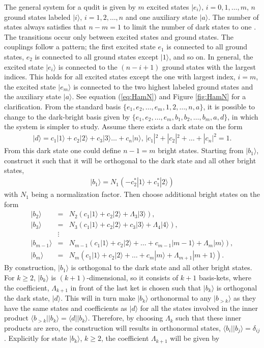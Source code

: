 \documentclass[pra,showpacs,priprent,twocolumn,superscriptaddress]{revtex4-1}
\newcommand{\ket}[1]{|#1\rangle}
\newcommand{\bra}[1]{\langle #1|}
\begin{document}
The general system for a qudit is given by $m$ excited states $\ket{e_i},\,i = 0,1,\dots,m$, $n$ ground states labeled $\ket{i},\,i = 1,2,\dots,n$ and one auxiliary state $\ket{a}$. The number of states always satisfies that $n-m = 1$ to limit the number of dark states to one \cite{shkolnikov20}.
The transitions occur only between excited states and ground states. The couplings follow a pattern; the first excited state $e_1$ is connected to all ground states, $e_2$ is connected to all ground states except $\ket{1}$, and so on. In general, the excited state $\ket{e_i}$ is connected to the $(n - i + 1)$ ground states with the largest indices. This holds for all excited states except the one with largest index, $i = m$, the excited state $\ket{e_m}$ is connected to the two highest labeled ground states and the auxiliary state $\ket{a}$. See equation (\ref{eq:HamN}) and Figure \ref{fig:HamN} for a clarification. 
From the standard basis $\{e_1,e_2,\dots,e_m,1,2,\dots,n,a\}$, it is possible to change to the dark-bright basis given by $\{e_1,e_2,\dots,e_m,b_1,b_2,\dots,b_{m},a,d\}$, in which the system is simpler to study. Assume there exists a dark state on the form 
\begin{eqnarray}
\ket{d} = c_1\ket{1} + c_2\ket{2} + c_3\ket{3} \dots + c_{n}\ket{n},\, |c_1|^2 + |c_2|^2 + \dots + |c_{n}|^2 = 1.
\end{eqnarray}
From this dark state one could define $n-1 = m$ bright states. Starting from $\ket{b_1}$, construct it such that it will be orthogonal to the dark state and all other bright states,
\begin{eqnarray}
\ket{b_1} = N_1\left(-c_2^{*}\ket{1} + c_1^{*}\ket{2}\right)
\end{eqnarray}
with $N_1$ being a normalization factor. Then choose additional bright states on the form
\begin{eqnarray}
\label{eq:birght_states}
\ket{b_2} &=& N_2 \left(c_1\ket{1} + c_2\ket{2} + \Lambda_3\ket{3}  \right),
\nonumber\\
\ket{b_3} &=&  N_3 \left(c_1\ket{1} + c_2\ket{2} + c_3\ket{3} + \Lambda_{4}\ket{4} \right),
\nonumber\\
&\vdots &
\nonumber\\
\ket{b_{m-1}} &=& N_{m-1} \left( c_1\ket{1} + c_2\ket{2} + \dots + c_{m-1}\ket{m-1}+ \Lambda_m\ket{m} \right),
\nonumber\\
\ket{b_{m}} &=& N_m \left( c_1\ket{1} + c_2\ket{2} + \dots + c_m\ket{m} + \Lambda_{m+1}\ket{m+1} \right).
\end{eqnarray}
By construction,  $\ket{b_1}$ is orthogonal to the dark state and all other bright states. For $k \geq 2$, $\ket{b_k}$ is $(k+1)$-dimensional, so it consists of $k+1$ basis-kets, where the coefficient, $\Lambda_{k+1}$ in front of the last ket is chosen such that $\ket{b_k}$ is orthogonal the dark state, $\ket{d}$. This will in turn make $\ket{b_k}$ orthonormal to any $\ket{b_{>k}}$ as they have the same states and coefficients as $\ket{d}$ for all the states involved in the inner product $\bra{b_{>k}}\ket{b_k} = \bra{d}\ket{b_k}$. Therefore, by choosing $\Lambda_k$ such that these inner products are zero, the construction will results in orthonormal states,  $\bra{b_i}\ket{b_j} = \delta_{ij}$. Explicitly for state $\ket{b_{k}}$, $k \geq 2$, the coefficient $\Lambda_{k+1}$ will be given by 
\end{document}
